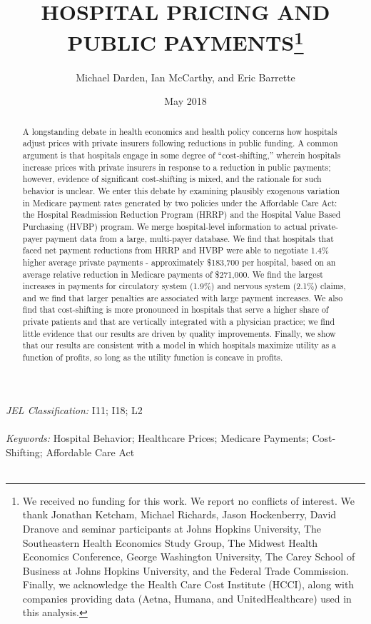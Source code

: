\documentclass[12pt]{article}
\begin{document}
\title{HOSPITAL PRICING AND PUBLIC PAYMENTS\thanks{We received no funding for this work.  We report no conflicts of interest. We thank Jonathan Ketcham, Michael Richards, Jason Hockenberry, David Dranove and seminar participants at Johns Hopkins University, The Southeastern Health Economics Study Group, The Midwest Health Economics Conference, George Washington University, The Carey School of Business at Johns Hopkins University, and the Federal Trade Commission.  Finally, we acknowledge the Health Care Cost Institute (HCCI), along with companies providing data (Aetna, Humana, and UnitedHealthcare) used in this analysis.}}
\author{%
  Michael Darden, Ian McCarthy, and Eric Barrette
}
\date{May 2018}

\maketitle

\begin{abstract}
A longstanding debate in health economics and health policy concerns how hospitals adjust prices with private insurers following reductions in public funding. A common argument is that hospitals engage in some degree of ``cost-shifting,'' wherein hospitals increase prices with private insurers in response to a reduction in public payments; however, evidence of significant cost-shifting is mixed, and the rationale for such behavior is unclear.  We enter this debate by examining plausibly exogenous variation in Medicare payment rates generated by two policies under the Affordable Care Act: the Hospital Readmission Reduction Program (HRRP) and the Hospital Value Based Purchasing (HVBP) program.  We merge hospital-level information to actual private-payer payment data from a large, multi-payer database. We find that hospitals that faced net payment reductions from HRRP and HVBP were able to negotiate 1.4\% higher average private payments - approximately \$183,700 per hospital, based on an average relative reduction in Medicare payments of \$271,000. We find the largest increases in payments for circulatory system (1.9\%) and nervous system (2.1\%) claims, and we find that larger penalties are associated with large payment increases.  We also find that cost-shifting is more pronounced in hospitals that serve a higher share of private patients and that are vertically integrated with a physician practice; we find little evidence that our results are driven by quality improvements.  Finally, we show that our results are consistent with a model in which hospitals maximize utility as a function of profits, so long as the utility function is concave in profits.
\end{abstract}
\noindent \textit{JEL Classification:} I11; I18; L2 \\\\
\noindent \textit{Keywords:} Hospital Behavior; Healthcare Prices; Medicare Payments; Cost-Shifting; Affordable Care Act\\\\
\end{document}
